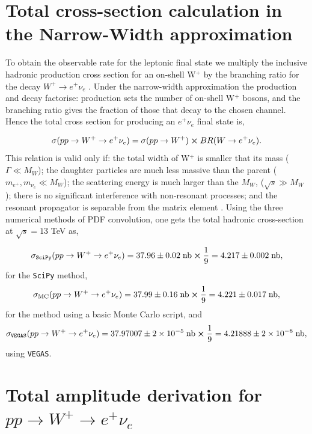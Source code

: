 \documentclass[a4paper,11pt]{article}
\begin{document}
\section{Total cross-section calculation in the  Narrow-Width approximation}\label{sec4}

To obtain the observable rate for the leptonic final state we multiply the inclusive hadronic production cross section for an on-shell W$^+$ by the branching ratio for the decay $W^+ \rightarrow e^+ \nu_e$ . Under the  narrow-width approximation the production and decay factorise: production sets the number of on-shell W$^+$ bosons, and the branching ratio gives the fraction of those that decay to the chosen channel. Hence the total cross section for producing an $e^+ \nu_e$ final state is,

$$
	\sigma(pp \rightarrow W^+ \rightarrow e^+ \nu_e) = 	\sigma(pp \rightarrow W^+) \cross BR(W \rightarrow e^+ \nu_e).
$$
This relation is valid only if: the total width of W$^+$ is smaller that its mass ($\Gamma \ll M_W$); the daughter particles are much less massive than the parent ($m_{e^+}, m_{\nu_e} \ll M_W$); the scattering energy is much larger than the $M_W$, ($\sqrt{s} \gg M_W$); there is no significant interference with non-resonant processes; and the resonant propagator is separable from the matrix element \cite{Berdine:2007uv}. Using the three numerical methods of PDF convolution, one gets the total hadronic cross-section at $\sqrt{s} = 13$ TeV as,

\begin{equation}
		\sigma_\text{\texttt{SciPy}}(pp \rightarrow W^+ \rightarrow e^+ \nu_e) = 37.96 \pm 0.02\; \text{nb} \cross \frac{1}{9} = 4.217 \pm 0.002\; \text{nb},
\end{equation}
for the \texttt{SciPy} method, 
\begin{equation}
	\sigma_\text{MC}(pp\rightarrow W^+ \rightarrow e^+ \nu_e) = 37.99 \pm 0.16\; \text{nb} \cross \frac{1}{9} = 4.221 \pm 0.017\; \text{nb},
\end{equation}
for the method using a basic Monte Carlo script, and 
\begin{equation}
	\sigma_\text{\texttt{VEGAS}}(pp\rightarrow W^+ \rightarrow e^+ \nu_e) = 37.97007 \pm 2\times10^{-5}\; \text{nb} \cross \frac{1}{9} = 4.21888 \pm 2\times10^{-6}\; \text{nb},
\end{equation}
using \texttt{VEGAS}.
\section{Total amplitude derivation for $pp \rightarrow W^+ \rightarrow e^+ \nu_e$}\label{sec5}
\end{document}
